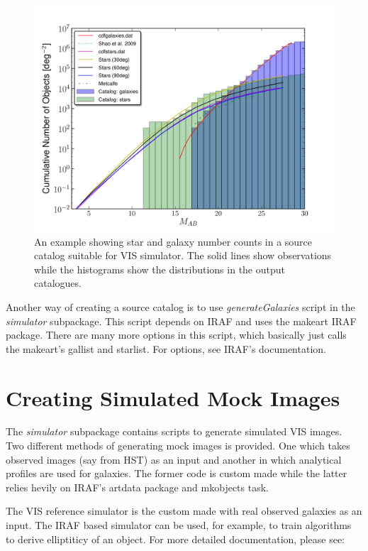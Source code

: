 \documentclass[a4paper,11pt,english]{sphinxmanual}
\begin{document}
\begin{figure}[htbp]
\centering
\capstart

\includegraphics{Distributions.pdf}
\caption{An example showing star and galaxy number counts in a source catalog suitable for VIS simulator.
The solid lines show observations while the histograms show the distributions in the output catalogues.}\end{figure}

Another way of creating a source catalog is to use \emph{generateGalaxies} script in the \emph{simulator} subpackage.
This script depends on IRAF and uses the makeart IRAF package. There are many more options in this script,
which basically just calls the makeart's gallist and starlist. For options, see IRAF's documentation.


\chapter{Creating Simulated Mock Images}
\label{index:creating-simulated-mock-images}
The \emph{simulator} subpackage contains scripts to generate simulated VIS images. Two different methods
of generating mock images is provided. One which takes observed images (say from HST) as an input and
another in which analytical profiles are used for galaxies. The former code is custom made while the
latter relies hevily on IRAF's artdata package and mkobjects task.

The VIS reference simulator is the custom made with real observed galaxies as an input. The IRAF
based simulator can be used, for example, to train algorithms to derive elliptiticy of an object.
For more detailed documentation, please see:
\end{document}
